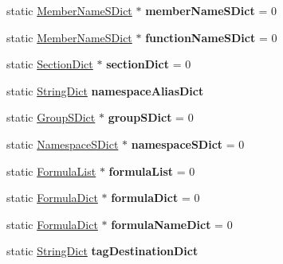 \begin{DoxyCompactItemize}
static \mbox{\hyperlink{class_member_name_s_dict}{Member\+Name\+S\+Dict}} $\ast$ {\bfseries member\+Name\+S\+Dict} = 0
\item 
\mbox{\label{class_doxygen_a92d3467a1bfaf71ef47a7fd55370d225}} 
static \mbox{\hyperlink{class_member_name_s_dict}{Member\+Name\+S\+Dict}} $\ast$ {\bfseries function\+Name\+S\+Dict} = 0
\item 
\mbox{\label{class_doxygen_a11ca62448704d211a405166d73337113}} 
static \mbox{\hyperlink{class_section_dict}{Section\+Dict}} $\ast$ {\bfseries section\+Dict} = 0
\item 
\mbox{\label{class_doxygen_af8d5f506cba2c63d6ce05df4ff878058}} 
static \mbox{\hyperlink{class_string_dict}{String\+Dict}} {\bfseries namespace\+Alias\+Dict}
\item 
\mbox{\label{class_doxygen_ac4ba7650052c59ebd8a988c72947ae4c}} 
static \mbox{\hyperlink{class_group_s_dict}{Group\+S\+Dict}} $\ast$ {\bfseries group\+S\+Dict} = 0
\item 
\mbox{\label{class_doxygen_af274fccf04128e815fd52f633ee1dd03}} 
static \mbox{\hyperlink{class_namespace_s_dict}{Namespace\+S\+Dict}} $\ast$ {\bfseries namespace\+S\+Dict} = 0
\item 
\mbox{\label{class_doxygen_aa06b1a63729d23c453ecda852f96bead}} 
static \mbox{\hyperlink{class_formula_list}{Formula\+List}} $\ast$ {\bfseries formula\+List} = 0
\item 
\mbox{\label{class_doxygen_a9d1da6dc45ebbe915e411c5282b648b2}} 
static \mbox{\hyperlink{class_formula_dict}{Formula\+Dict}} $\ast$ {\bfseries formula\+Dict} = 0
\item 
\mbox{\label{class_doxygen_a76cbdd291a661c0e4f7a060a198c6adb}} 
static \mbox{\hyperlink{class_formula_dict}{Formula\+Dict}} $\ast$ {\bfseries formula\+Name\+Dict} = 0
\item 
\mbox{\label{class_doxygen_a88e47b2392d8845dfb569e4eb56672d4}} 
static \mbox{\hyperlink{class_string_dict}{String\+Dict}} {\bfseries tag\+Destination\+Dict}
\item 

\end{DoxyCompactItemize}
